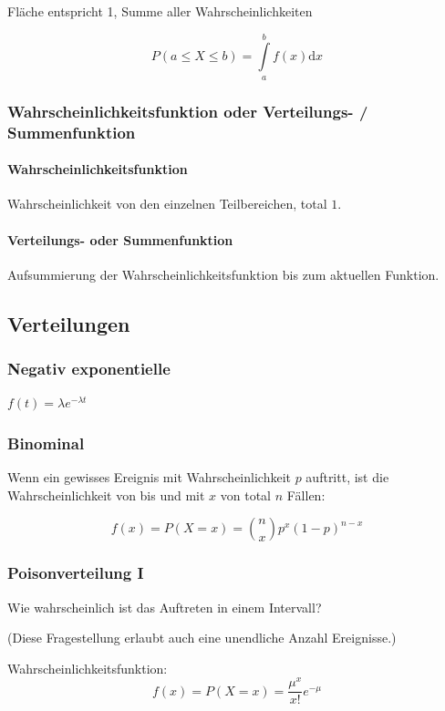 Fläche entspricht 1, Summe aller Wahrscheinlichkeiten

\[
P(a \leq X \leq b) = \int\limits^b_a{f(x)\mathrm{d}x}
\]

\subsubsection{Wahrscheinlichkeitsfunktion oder Verteilungs- / Summenfunktion}

\paragraph{Wahrscheinlichkeitsfunktion} Wahrscheinlichkeit von den einzelnen Teilbereichen, total $1$.

\paragraph{Verteilungs- oder Summenfunktion} Aufsummierung der Wahrscheinlichkeitsfunktion bis zum aktuellen Funktion.


\subsection{Verteilungen}
\subsubsection{Negativ exponentielle}
$f(t) = \lambda e^{-\lambda t}$

\subsubsection{Binominal}

Wenn ein gewisses Ereignis mit Wahrscheinlichkeit $p$ auftritt, ist die Wahrscheinlichkeit von bis und mit $x$ von total $n$ Fällen:

\[
	f(x) = P(X=x) = \binom{n}{x}p^x(1-p)^{n-x}
\]

\subsubsection{Poisonverteilung I}

Wie wahrscheinlich ist das Auftreten in einem Intervall?

(Diese Fragestellung erlaubt auch eine unendliche Anzahl Ereignisse.)

Wahrscheinlichkeitsfunktion:
\[
	f(x) = P(X=x) = \frac{\mu^x}{x!}e^{-\mu}
\]

